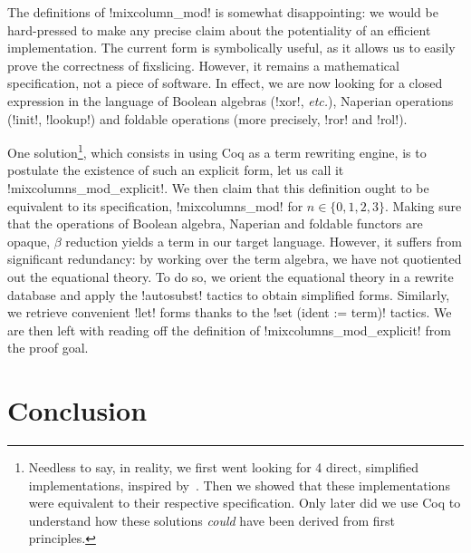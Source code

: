 \documentclass[draft,english]{jflart}
\newcommand{\etc}{\textit{etc.}}
\begin{document}


The definitions of \coqe!mixcolumn_mod! is somewhat disappointing: we
would be hard-pressed to make any precise claim about the potentiality
of an efficient implementation. The current form is symbolically
useful, as it allows us to easily prove the correctness of fixslicing.
However, it remains a mathematical specification, not a piece of
software. In effect, we are now looking for a closed expression in the
language of Boolean algebras (\coqe!xor!, \etc{}), Naperian operations
(\coqe!init!, \coqe!lookup!) and foldable operations (more precisely,
\coqe!ror! and \coqe!rol!).

One solution\footnote{Needless to say, in reality, we first went
looking for 4 direct, simplified implementations, inspired
by~\citet{adominicai:fixslicing-gift}. Then we showed that these
implementations were equivalent to their respective
specification. Only later did we use Coq to understand how these
solutions \emph{could} have been derived from first principles.},
which consists in using Coq as a term rewriting engine, is to
postulate the existence of such an explicit form, let us call it
%
\coqe!mixcolumns_mod_explicit!.
%
We then claim that this definition ought to be equivalent to its
specification, \coqe!mixcolumns_mod! for $n \in \{0, 1, 2, 3\}$.
Making sure that the operations of Boolean algebra, Naperian and
foldable functors are opaque, $\beta$ reduction yields a term in our
target language. However, it suffers from significant redundancy: by
working over the term algebra, we have not quotiented out the
equational theory. To do so, we orient the equational theory in a
rewrite database and apply the \coqe!autosubst! tactics to obtain
simplified forms. Similarly, we retrieve convenient \coqe!let! forms
thanks to the \coqe!set (ident := term)! tactics. We are then left
with reading off the definition of \coqe!mixcolumns_mod_explicit! from
the proof goal.



\section{Conclusion}
\end{document}
